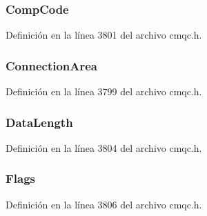 \hypertarget{structtag_m_q_c_b_c_a3d53860a50c3834d3dad9f5b2e5b5234}{}
\subsubsection[{Comp\+Code}]{ Comp\+Code}\label{structtag_m_q_c_b_c_a3d53860a50c3834d3dad9f5b2e5b5234}


Definición en la línea 3801 del archivo cmqc.\+h.

\hypertarget{structtag_m_q_c_b_c_a58c83e52e3187c1579e9aeb6c52ded13}{}
\subsubsection[{Connection\+Area}]{ Connection\+Area}\label{structtag_m_q_c_b_c_a58c83e52e3187c1579e9aeb6c52ded13}


Definición en la línea 3799 del archivo cmqc.\+h.

\hypertarget{structtag_m_q_c_b_c_a75a536f04bbb17c49970e5ebeaeecacf}{}
\subsubsection[{Data\+Length}]{ Data\+Length}\label{structtag_m_q_c_b_c_a75a536f04bbb17c49970e5ebeaeecacf}


Definición en la línea 3804 del archivo cmqc.\+h.

\hypertarget{structtag_m_q_c_b_c_a8da770267273b200fa9c968fa2a0da57}{}
\subsubsection[{Flags}]{ Flags}\label{structtag_m_q_c_b_c_a8da770267273b200fa9c968fa2a0da57}


Definición en la línea 3806 del archivo cmqc.\+h.

